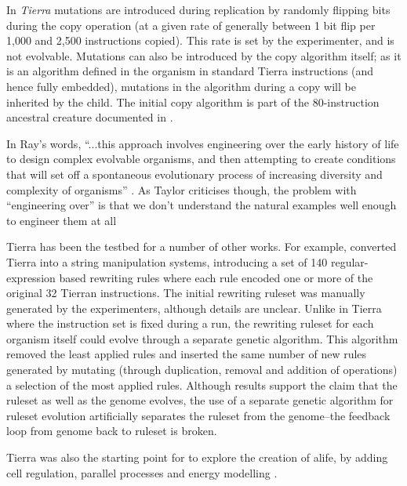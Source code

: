 In \emph{Tierra} \parencite{Ray1991} mutations are introduced during replication by randomly flipping bits during the copy operation (at a given rate of generally between 1 bit flip per 1,000 and 2,500 instructions copied). This rate is set by the experimenter, and is not evolvable. Mutations can also be introduced by the copy algorithm itself; as it is an algorithm defined in the organism in standard Tierra instructions (and hence fully embedded), mutations in the algorithm during a copy will be inherited by the child. The initial copy algorithm is part of the 80-instruction ancestral creature documented in \textcite[app.C]{Ray1991}.

In Ray's words, ``...this approach involves engineering over the early history of life to design complex evolvable organisms, and then attempting to create conditions that will set off a spontaneous evolutionary process of increasing diversity and complexity of organisms'' \parencite[p.3]{Ray1991}. As Taylor criticises though, the problem with ``engineering over'' is that we don't understand the natural examples well enough to engineer them at all \parencite{Taylor2001}

Tierra has been the testbed for a number of other works. For example, \textcite{SugiuraSuzukiShioseEtAl2003} converted Tierra into a string manipulation systems, introducing a set of 140 regular-expression based rewriting rules where each rule encoded one or more of the original 32 Tierran instructions. The initial rewriting ruleset was manually generated by the experimenters, although details are unclear. Unlike in Tierra where the instruction set is fixed during a run, the rewriting ruleset for each organism itself could evolve through a separate genetic algorithm. This algorithm removed the least applied rules and inserted the same number of new rules generated by mutating (through duplication, removal and addition of operations) a selection of the most applied rules. Although results support the claim that the ruleset as well as the genome evolves, the use of a separate genetic algorithm for ruleset evolution artificially separates the ruleset from the genome--the feedback loop from genome back to ruleset is broken.

Tierra was also the starting point for \textcite{Taylor2001, Taylor:1999sc} to explore the creation of \gls{alife}, by adding cell regulation, parallel processes and energy modelling \textcite[p.4]{Taylor:1999sc}.


